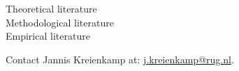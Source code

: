 \faSquareO \vspace{1em} Theoretical literature\\
\faSquareO \vspace{1em} Methodological literature\\
\faSquareO \vspace{1em} Empirical literature



\divider

\divider

\divider

\divider

\divider

\divider

\divider

\divider





Contact Jannis Kreienkamp at: \href{mailto:j.kreienkamp@rug.nl}{j.kreienkamp@rug.nl}.

